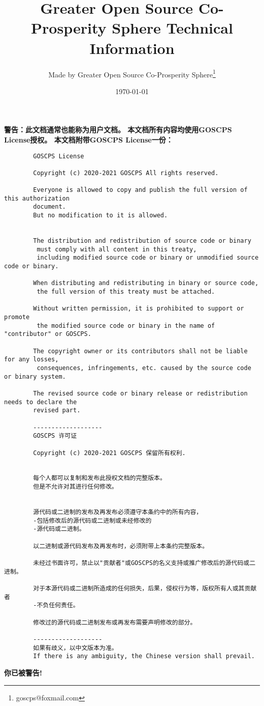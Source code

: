 \documentclass[UTF-8,twoside,a4paper,draft,titlepage]{ctexbook}
\begin{document}
	\frontmatter
	
	\title{Greater Open Source Co-Prosperity Sphere Technical Information} 
	\author{Made by Greater Open Source Co-Prosperity Sphere\thanks{goscps@foxmail.com}}
	\date{\today}
	\maketitle
	
	\textbf{警告：此文档通常也能称为用户文档。
		本文档所有内容均使用GOSCPS License授权。\newline{}
		本文档附带GOSCPS License一份：}
	\begin{verbatim}
		GOSCPS License
		
		Copyright (c) 2020-2021 GOSCPS All rights reserved.
		
		Everyone is allowed to copy and publish the full version of this authorization 
		document.
		But no modification to it is allowed.
		
		
		The distribution and redistribution of source code or binary 
		 must comply with all content in this treaty,
		 including modified source code or binary or unmodified source code or binary.
		
		When distributing and redistributing in binary or source code,
		 the full version of this treaty must be attached.
		
		Without written permission, it is prohibited to support or promote
		 the modified source code or binary in the name of "contributor" or GOSCPS.
		
		The copyright owner or its contributors shall not be liable for any losses,
		 consequences, infringements, etc. caused by the source code or binary system.
		
		The revised source code or binary release or redistribution needs to declare the 
		revised part.
		
		-------------------
		GOSCPS 许可证
		
		Copyright (c) 2020-2021 GOSCPS 保留所有权利.
		
		
		每个人都可以复制和发布此授权文档的完整版本。
		但是不允许对其进行任何修改。
		
		
		源代码或二进制的发布及再发布必须遵守本条约中的所有内容，
		-包括修改后的源代码或二进制或未经修改的
		-源代码或二进制。
		
		以二进制或源代码发布及再发布时，必须附带上本条约完整版本。
		
		未经过书面许可，禁止以"贡献者"或GOSCPS的名义支持或推广修改后的源代码或二进制。
		
		对于本源代码或二进制所造成的任何损失，后果，侵权行为等，版权所有人或其贡献者
		-不负任何责任。
		
		修改过的源代码或二进制发布或再发布需要声明修改的部分。
		
		-------------------
		如果有歧义，以中文版本为准。
		If there is any ambiguity, the Chinese version shall prevail.
	\end{verbatim}
	\textbf{你已被警告!}
	
	\tableofcontents
	
	\mainmatter
	
	
	
	\backmatter
	
	
\end{document}
